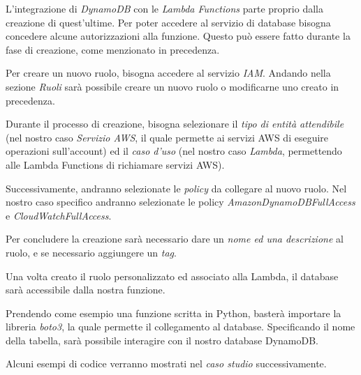 L'integrazione di \textit{DynamoDB} con le \textit{Lambda Functions} parte proprio dalla creazione di quest'ultime. Per poter accedere al servizio di database bisogna concedere alcune autorizzazioni alla funzione. Questo può essere fatto durante la fase di creazione, come menzionato in precedenza.

Per creare un nuovo ruolo, bisogna accedere al servizio \textit{IAM}. Andando nella sezione \textit{Ruoli} sarà possibile creare un nuovo ruolo o modificarne uno creato in precedenza.

Durante il processo di creazione, bisogna selezionare il \textit{tipo di entità attendibile} (nel nostro caso \textit{Servizio AWS}, il quale permette ai servizi AWS di eseguire operazioni sull'account) ed il \textit{caso d'uso} (nel nostro caso \textit{Lambda}, permettendo alle Lambda Functions di richiamare servizi AWS).

Successivamente, andranno selezionate le \textit{policy} da collegare al nuovo ruolo. Nel nostro caso specifico andranno selezionate le policy \textit{AmazonDynamoDBFullAccess} e \textit{CloudWatchFullAccess}.

Per concludere la creazione sarà necessario dare un \textit{nome ed una descrizione} al ruolo, e se necessario aggiungere un \textit{tag}.

Una volta creato il ruolo personalizzato ed associato alla Lambda, il database sarà accessibile dalla nostra funzione.

Prendendo come esempio una funzione scritta in Python, basterà importare la libreria \textit{boto3}, la quale permette il collegamento al database. Specificando il nome della tabella, sarà possibile interagire con il nostro database DynamoDB.

Alcuni esempi di codice verranno mostrati nel \textit{caso studio} successivamente.
